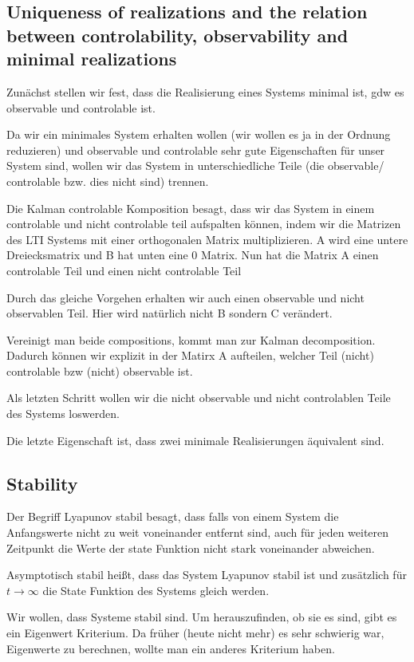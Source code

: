 \documentclass[]{article}
\begin{document}
\subsection{Uniqueness of realizations and the relation between controlability, observability and minimal realizations}

Zunächst stellen wir fest, dass die Realisierung eines Systems minimal ist, gdw es observable und controlable ist. 

Da wir ein minimales System erhalten wollen (wir wollen es ja in der Ordnung reduzieren) und observable und controlable sehr gute Eigenschaften für unser System sind, wollen wir das System in unterschiedliche Teile (die observable/ controlable bzw. dies nicht sind) trennen. 

Die Kalman controlable Komposition besagt, dass wir das System in einem controlable und nicht controlable teil aufspalten können, indem wir die Matrizen des LTI Systems mit einer orthogonalen Matrix multiplizieren. A wird eine untere Dreiecksmatrix und B hat unten eine 0 Matrix. Nun hat die Matrix A einen controlable Teil und einen nicht controlable Teil

Durch das gleiche Vorgehen erhalten wir auch einen observable und nicht observablen Teil. Hier wird natürlich nicht B sondern C verändert. 

Vereinigt man beide compositions, kommt man zur Kalman decomposition. Dadurch können wir explizit in der Matirx A aufteilen, welcher Teil (nicht) controlable bzw (nicht) observable ist. 

Als letzten Schritt wollen wir die nicht observable und nicht controlablen Teile des Systems loswerden. 

Die letzte Eigenschaft ist, dass zwei minimale Realisierungen äquivalent sind. 

\subsection{Stability}
 Der Begriff Lyapunov stabil besagt, dass falls von einem System die Anfangswerte nicht zu weit voneinander entfernt sind, auch für jeden weiteren Zeitpunkt die Werte der state Funktion nicht stark voneinander abweichen. 
 
 Asymptotisch stabil heißt, dass das System Lyapunov stabil ist und zusätzlich für $ t \rightarrow \infty$
 die State Funktion des Systems gleich werden. 
 
 Wir wollen, dass Systeme stabil sind. Um herauszufinden, ob sie es sind, gibt es ein Eigenwert Kriterium. Da früher (heute nicht mehr) es sehr schwierig war, Eigenwerte zu berechnen, wollte man ein anderes Kriterium haben.
 
\end{document}
